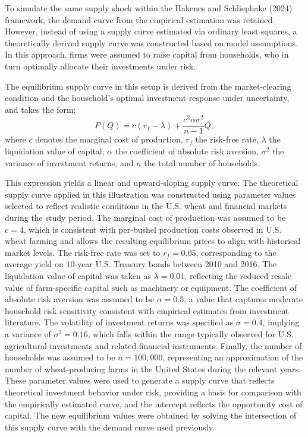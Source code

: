 \documentclass[12pt,a4paper]{article}%
\begin{document}
To simulate the same supply shock within the Hakenes and Schliephake (2024) framework, the demand curve from the empirical estimation was retained. However, instead of using a supply curve estimated via ordinary least squares, a theoretically derived supply curve was constructed based on model assumptions. In this approach, firms were assumed to raise capital from households, who in turn optimally allocate their investments under risk.

The equilibrium supply curve in this setup is derived from the market-clearing condition and the household's optimal investment response under uncertainty, and takes the form:
\[
P(Q) = c(r_f - \lambda) + \frac{c^2 \alpha \sigma^2}{n - 1} Q,
\]
where \( c \) denotes the marginal cost of production, \( r_f \) the risk-free rate, \( \lambda \) the liquidation value of capital, \( \alpha \) the coefficient of absolute risk aversion, \( \sigma^2 \) the variance of investment returns, and \( n \) the total number of households. 

This expression yields a linear and upward-sloping supply curve. The theoretical supply curve applied in this illustration was constructed using parameter values selected to reflect realistic conditions in the U.S. wheat and financial markets during the study period. The marginal cost of production was assumed to be $c = 4$, which is consistent with per-bushel production costs observed in U.S. wheat farming and allows the resulting equilibrium prices to align with historical market levels. The risk-free rate was set to $r_f = 0.05$, corresponding to the average yield on 10-year U.S. Treasury bonds between 2010 and 2016. The liquidation value of capital was taken as $\lambda = 0.01$, reflecting the reduced resale value of farm-specific capital such as machinery or equipment. The coefficient of absolute risk aversion was assumed to be $\alpha = 0.5$, a value that captures moderate household risk sensitivity consistent with empirical estimates from investment literature. The volatility of investment returns was specified as $\sigma = 0.4$, implying a variance of $\sigma^2 = 0.16$, which falls within the range typically observed for U.S. agricultural investments and related financial instruments. Finally, the number of households was assumed to be $n = 100{,}000$, representing an approximation of the number of wheat-producing farms in the United States during the relevant years. These parameter values were used to generate a supply curve that reflects theoretical investment behavior under risk, providing a basis for comparison with the empirically estimated curve, and the intercept reflects the opportunity cost of capital. The new equilibrium values were obtained by solving the intersection of this supply curve with the demand curve used previously.
\end{document}
